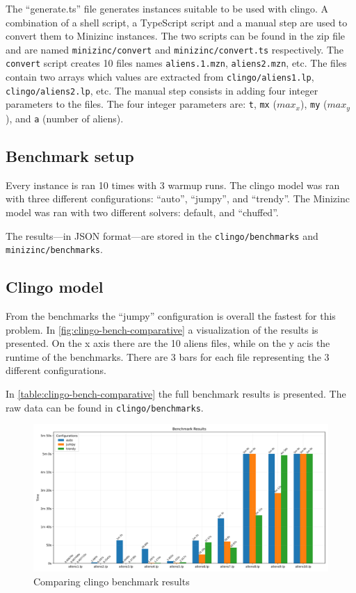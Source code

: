 \documentclass[11pt]{article}
\begin{document}
The ``generate.ts'' file generates instances suitable to be used with clingo.
A combination of a shell script, a TypeScript script and a manual step are used to convert them to Minizinc instances.
The two scripts can be found in the zip file and are named \texttt{minizinc/convert} and \texttt{minizinc/convert.ts} respectively.
The \texttt{convert} script creates 10 files names \texttt{aliens.1.mzn}, \texttt{aliens2.mzn}, etc.
The files contain two arrays which values are extracted from \texttt{clingo/aliens1.lp}, \texttt{clingo/aliens2.lp}, etc.
The manual step consists in adding four integer parameters to the files.
The four integer parameters are: \texttt{t}, \texttt{mx} ($max_x$), \texttt{my} ($max_y$), and \texttt{a} (number of aliens).

\subsection{Benchmark setup}

Every instance is ran 10 times with 3 warmup runs.
The clingo model was ran with three different configurations: ``auto'', ``jumpy'', and ``trendy''.
The Minizinc model was ran with two different solvers: default, and ``chuffed''.

The results---in JSON format---are stored in the \texttt{clingo/benchmarks} and \texttt{minizinc/benchmarks}.

\subsection{Clingo model}

From the benchmarks the ``jumpy'' configuration is overall the fastest for this problem.
In \autoref{fig:clingo-bench-comparative} a visualization of the results is presented.
On the x axis there are the 10 aliens files, while on the y acis the runtime of the benchmarks.
There are 3 bars for each file representing the 3 different configurations.

In \autoref{table:clingo-bench-comparative} the full benchmark results is presented.
The raw data can be found in \texttt{clingo/benchmarks}.

\begin{figure}[]
  \centering
  \includegraphics[width=\textwidth]{./clingo/benchmarks/comparative.png}
  \caption{Comparing clingo benchmark results}
  \label{fig:clingo-bench-comparative}
\end{figure}
\end{document}
